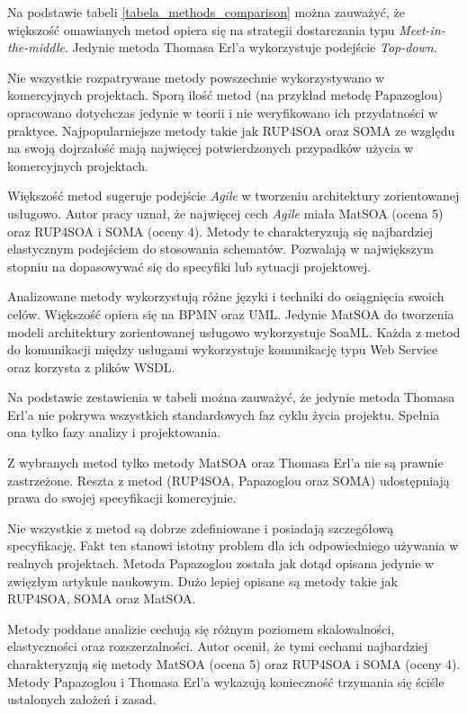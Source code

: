 Na podstawie tabeli \ref{tabela_methods_comparison} można zauważyć, że większość omawianych metod opiera się na strategii dostarczania typu \emph{Meet-in-the-middle}. Jedynie metoda Thomasa Erl'a wykorzystuje podejście \emph{Top-down}.

Nie wszystkie rozpatrywane metody powszechnie wykorzystywano w komercyjnych projektach. Sporą ilość metod (na przykład metodę Papazoglou) opracowano dotychczas jedynie w teorii i nie weryfikowano ich przydatności w praktyce. Najpopularniejsze metody takie jak RUP4SOA oraz SOMA ze względu na swoją dojrzałość mają najwięcej potwierdzonych przypadków użycia w komercyjnych projektach.

Większość metod sugeruje podejście \emph{Agile} w tworzeniu architektury zorientowanej usługowo. Autor pracy uznał, że najwięcej cech \emph{Agile} miała MatSOA (ocena 5) oraz RUP4SOA i SOMA (oceny 4). Metody te charakteryzują się najbardziej elastycznym podejściem do stosowania schematów. Pozwalają w największym stopniu na dopasowywać się do specyfiki lub sytuacji projektowej.

Analizowane metody wykorzystują różne języki i techniki do osiągnięcia swoich celów. Większość opiera się na BPMN oraz UML. Jedynie MatSOA do tworzenia modeli architektury zorientowanej usługowo wykorzystuje SoaML. Każda z metod do komunikacji między usługami wykorzystuje komunikację typu Web Service oraz korzysta z plików WSDL.

Na podstawie zestawienia w tabeli można zauważyć, że jedynie metoda Thomasa Erl'a nie pokrywa wszystkich standardowych faz cyklu życia projektu. Spełnia ona tylko fazy analizy i projektowania.

Z wybranych metod tylko metody MatSOA oraz Thomasa Erl'a nie są prawnie zastrzeżone. Reszta z metod (RUP4SOA, Papazoglou oraz SOMA) udostępniają prawa do swojej specyfikacji komercyjnie. 

Nie wszystkie z metod są dobrze zdefiniowane i posiadają szczegółową specyfikację. Fakt ten stanowi istotny problem dla ich odpowiedniego używania w realnych projektach. Metoda Papazoglou została jak dotąd opisana jedynie w zwięzłym artykule naukowym. Dużo lepiej opisane są metody takie jak RUP4SOA, SOMA oraz MatSOA. 

Metody poddane analizie cechują się różnym poziomem skalowalności, elastyczności oraz rozszerzalności. Autor ocenił, że tymi cechami najbardziej charakteryzują się metody MatSOA (ocena 5) oraz RUP4SOA i SOMA (oceny 4). Metody Papazoglou i Thomasa Erl'a wykazują konieczność trzymania się ściśle ustalonych założeń i zasad.

